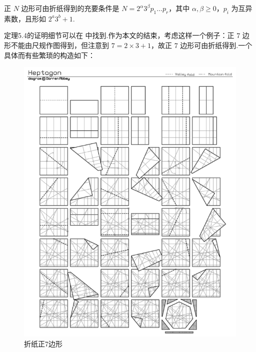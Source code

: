 \begin{theorem}
    正 $N$ 边形可由折纸得到的充要条件是 $N=2^\alpha 3^\beta p_1\dots p_r$，其中 $\alpha,\beta\geq 0$，$p_i$ 为互异素数，且形如 $2^a3^b+1$.
\end{theorem}

定理5.4的证明细节可以在 \cite{Vid}中找到.作为本文的结束，考虑这样一个例子：正 $7$ 边形不能由尺规作图得到，但注意到 $7=2\times 3+1$，故正 $7$ 边形可由折纸得到.一个具体而有些繁琐的构造如下：

\begin{figure}[h]
    \centering
    \includegraphics[scale=0.5]{7-gons.png}
    \caption{折纸正7边形}
\end{figure}